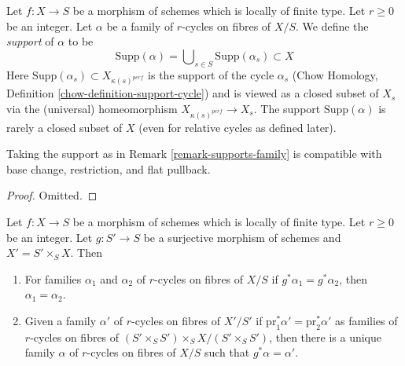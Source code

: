 \begin{remark}[Support]
\label{remark-supports-family}
Let $f : X \to S$ be a morphism of schemes which is locally of finite type.
Let $r \geq 0$ be an integer. Let $\alpha$ be a family of $r$-cycles
on fibres of $X/S$. We define the {\it support} of $\alpha$ to be
$$
\text{Supp}(\alpha) = \bigcup\nolimits_{s \in S} \text{Supp}(\alpha_s) \subset X
$$
Here $\text{Supp}(\alpha_s) \subset X_{\kappa(s)^{perf}}$ is the
support of the cycle $\alpha_s$
(Chow Homology, Definition \ref{chow-definition-support-cycle})
and is viewed as
a closed subset of $X_s$ via the (universal) homeomorphism
$X_{\kappa(s)^{perf}} \to X_s$. The support $\text{Supp}(\alpha)$
is rarely a closed subset of $X$ (even for relative cycles as
defined later).
\end{remark}

\begin{lemma}
\label{lemma-support-family}
Taking the support as in Remark \ref{remark-supports-family}
is compatible with base change, restriction, and flat pullback.
\end{lemma}

\begin{proof}
Omitted.
\end{proof}

\begin{lemma}
\label{lemma-descend-family}
Let $f : X \to S$ be a morphism of schemes which is locally of finite type.
Let $r \geq 0$ be an integer. Let $g : S' \to S$ be a surjective morphism of
schemes and $X' = S' \times_S X$. Then
\begin{enumerate}
\item For families $\alpha_1$ and $\alpha_2$ of $r$-cycles on fibres of $X/S$
if $g^*\alpha_1 = g^*\alpha_2$, then $\alpha_1 = \alpha_2$.
\item Given a family $\alpha'$ of $r$-cycles on fibres of $X'/S'$ if
$\text{pr}_1^*\alpha' = \text{pr}_2^*\alpha'$ as families of
$r$-cycles on fibres of $(S' \times_S S') \times_S X / (S' \times_S S')$,
then there is a unique family $\alpha$ of $r$-cycles on fibres of $X/S$
such that $g^*\alpha = \alpha'$.
\end{enumerate}
\end{lemma}

